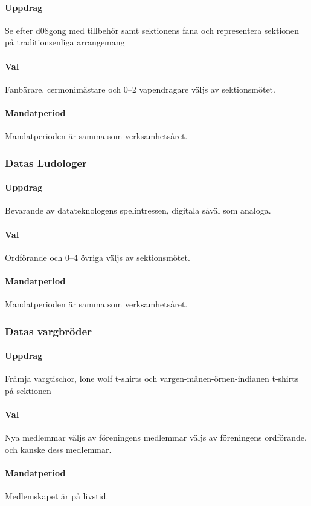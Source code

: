 \paragraph{Uppdrag}
Se efter d08gong med tillbehör samt sektionens fana och representera sektionen på traditionsenliga arrangemang
\paragraph{Val}
Fanbärare, cermonimästare och 0--2 vapendragare väljs av sektionsmötet.
\paragraph{Mandatperiod}
Mandatperioden är samma som verksamhetsåret. 
\subsubsection{Datas Ludologer}
\paragraph{Uppdrag}
Bevarande av datateknologens spelintressen, digitala såväl som analoga.
\paragraph{Val}
Ordförande och 0--4 övriga väljs av sektionsmötet.
\paragraph{Mandatperiod}
Mandatperioden är samma som verksamhetsåret. 
\subsubsection{Datas vargbröder}
\paragraph{Uppdrag}
Främja vargtischor, lone wolf t-shirts och vargen-månen-örnen-indianen t-shirts på sektionen 
\paragraph{Val}
Nya medlemmar väljs av föreningens medlemmar väljs av föreningens ordförande, och kanske dess medlemmar.
\paragraph{Mandatperiod}
Medlemskapet är på livstid. 
\newpage

